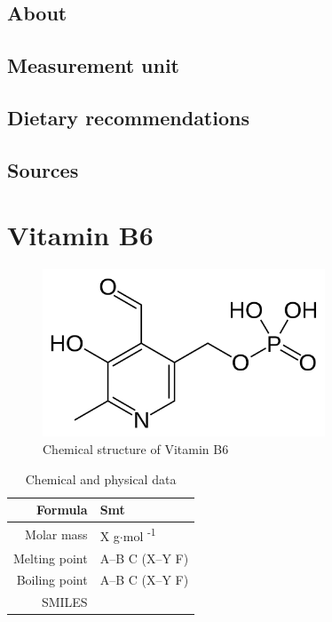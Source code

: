 \documentclass{book}
\begin{document}
\section{About}


\section{Measurement unit}


\section{Dietary recommendations}


\section{Sources}


\chapter{Vitamin B6}
\begin{figure}[h]
	\caption{Chemical structure of Vitamin B6}
	\centering \includegraphics[width=0.75\textwidth]{images/Vitamin_B6_chemical_structure}
\end{figure}

\begin{table}[h]
	\caption{Chemical and physical data}
	\centering \begin{tabular}{| r | l |}
		\hline
		Formula & Smt\\ \hline
		Molar mass & X g$\cdot$mol \textsuperscript{-1}\\ \hline
		Melting point & A--B \degree C (X--Y \degree F)\\ \hline
		Boiling point & A--B \degree C (X--Y \degree F)\\ \hline
		SMILES & \\ \hline
	\end{tabular}
\end{table}
\newpage
\end{document}
